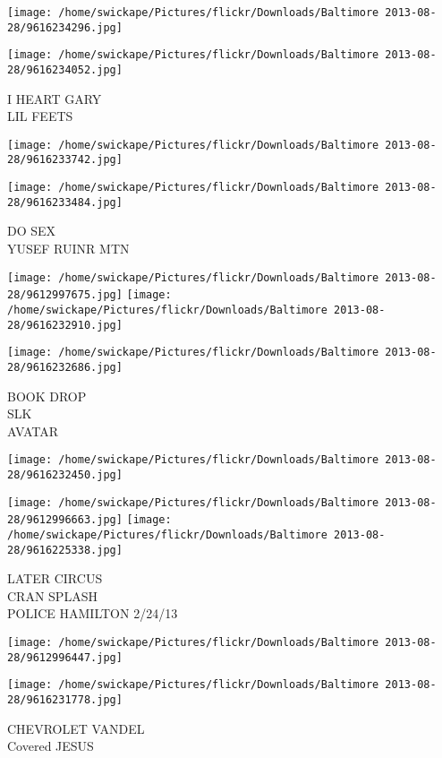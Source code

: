 \documentclass[10pt,letterpaper]{article}
\begin{document}
\texttt{[image: /home/swickape/Pictures/flickr/Downloads/Baltimore 2013-08-28/9616234296.jpg]}

\vspace{0.25in}
\texttt{[image: /home/swickape/Pictures/flickr/Downloads/Baltimore 2013-08-28/9616234052.jpg]}

I HEART GARY\\
LIL FEETS
\pagebreak

\texttt{[image: /home/swickape/Pictures/flickr/Downloads/Baltimore 2013-08-28/9616233742.jpg]}

\vspace{0.25in}
\texttt{[image: /home/swickape/Pictures/flickr/Downloads/Baltimore 2013-08-28/9616233484.jpg]}

DO SEX\\
YUSEF RUINR MTN
\pagebreak

\texttt{[image: /home/swickape/Pictures/flickr/Downloads/Baltimore 2013-08-28/9612997675.jpg]}
\texttt{[image: /home/swickape/Pictures/flickr/Downloads/Baltimore 2013-08-28/9616232910.jpg]}

\texttt{[image: /home/swickape/Pictures/flickr/Downloads/Baltimore 2013-08-28/9616232686.jpg]}

BOOK DROP\\
SLK\\
AVATAR
\pagebreak

\texttt{[image: /home/swickape/Pictures/flickr/Downloads/Baltimore 2013-08-28/9616232450.jpg]}

\vspace{0.25in}
\texttt{[image: /home/swickape/Pictures/flickr/Downloads/Baltimore 2013-08-28/9612996663.jpg]}
\texttt{[image: /home/swickape/Pictures/flickr/Downloads/Baltimore 2013-08-28/9616225338.jpg]}

LATER CIRCUS\\
CRAN SPLASH\\
POLICE HAMILTON 2/24/13
\pagebreak

\texttt{[image: /home/swickape/Pictures/flickr/Downloads/Baltimore 2013-08-28/9612996447.jpg]}

\vspace{0.25in}
\texttt{[image: /home/swickape/Pictures/flickr/Downloads/Baltimore 2013-08-28/9616231778.jpg]}

CHEVROLET VANDEL\\
Covered JESUS
\pagebreak
\end{document}
